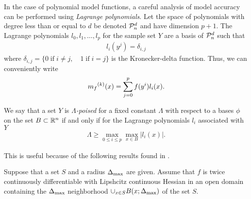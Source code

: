 In the case of polynomial model functions, a careful analysis of model accuracy can be performed using \emph{Lagrange polynomials}.
Let the space of polynomials with degree less than or equal to $d$ be denoted $\mathcal{P}^d_n$ and have dimension $p+1$.
The Lagrange polynomials $l_0, l_1, \ldots, l_p$ for the sample set $Y$ are a basis of $\mathcal{P}^d_n$ such that
\begin{align}
l_i(y^j) = \delta_{i,j}
\end{align}
where $\delta_{i,j} = \{0 \;\text{if}\; i\ne j,\quad 1 \;\text{if} \; i = j \}$ is the Kronecker-delta function.
Thus, we can conveniently write
\begin{align}
\label{reg}
{{m}_f}^{(k)}(x) = \sum^p_{j=0}f(y^i)l_i(x).
\end{align}

We say that a set $Y$ is \emph{$\Lambda$-poised} for a fixed constant $\Lambda$ with respect to a bases $\phi$ on the set 
$B \subset\mathbb R^n$ if and only if for the Lagrange polynomials $l_i$ associated with $Y$
\begin{align}
\Lambda \ge \max_{0\le i\le p}\max_{x\in B}|l_i(x)|.
\end{align}


This is useful because of the following results found in \cite{DUMMY:intro_book}.



\begin{assumption}
\label{fully_quadratic_assumption}
Suppose that a set $S$ and a radius $\Delta_{\text{max}}$ are given.
Assume that $f$ is twice continuously differentiable with Lipshcitz continuous Hessian in an open domain containing the $\Delta_{\text{max}}$ neighborhood
$\cup_{x \in S} B(x; \Delta_{\text{max}})$ of the set $S$.
\end{assumption}

